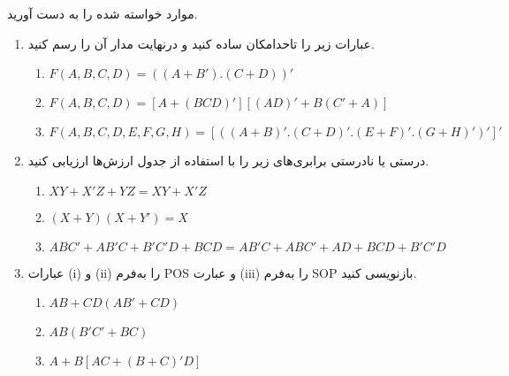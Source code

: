 موارد خواسته شده را به دست آورید.

\begin{enumerate}
	\item 
	عبارات زیر را تاحدامکان ساده کنید و درنهایت مدار آن را رسم کنید.
	
	\begin{latin}
		\begin{enumerate}
			\item $F(A, B, C, D) = ((A + B').(C + D))'$
			
			\item $F(A,B,C,D) = [A + (BCD)' ][ (AD)' + B(C' + A) ]$
			
			\item $F(A,B,C,D,E,F,G,H) = [ ((A + B)' . (C + D)' . (E + F)' . (G + H)' )' ]'$
		\end{enumerate}
	\end{latin}
	
	
	\item	
	درستی یا نادرستی برابری‌های زیر را با استفاده از جدول ارزش‌ها ارزیابی کنید.
	\begin{latin}
		\begin{enumerate}
			
			\item $XY + X' Z + YZ = XY + X' Z$
			
			\item $(X + Y) (X + Y') = X$
			
			\item $ABC′ + AB'C + B'C'D + BCD = AB'C + ABC' + AD + BCD + B'C'D$
		\end{enumerate}
	\end{latin}
	
	
	\item 
	عبارات (i) و (ii) را به‌فرم POS و عبارت (iii) را به‌فرم SOP بازنویسی کنید.
	\begin{latin}
		\begin{enumerate}
			\item $AB + CD (AB' + CD)$
			
			\item $AB (B' C' + BC)$
			
			\item $A + B[AC + (B + C)' D]$
		\end{enumerate}
	\end{latin}
	
	
	
	
\end{enumerate}